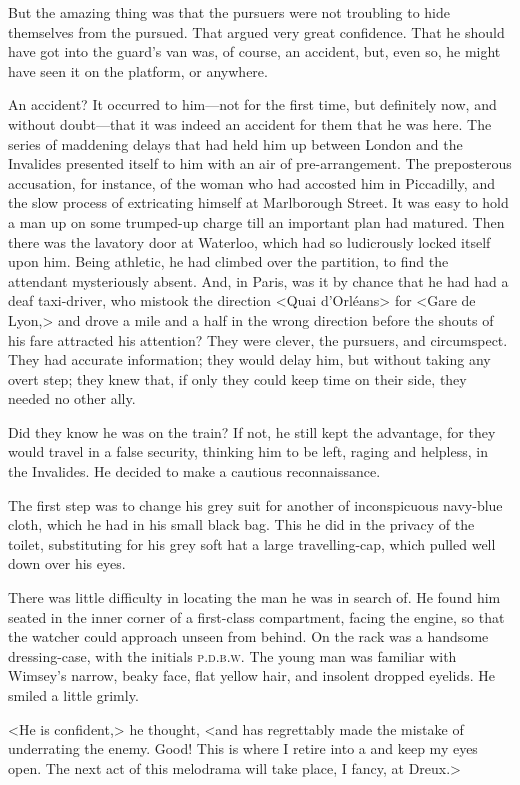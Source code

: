 But the amazing thing was that the pursuers were not troubling to hide themselves from the pursued. That argued very great confidence. That he should have got into the guard's van was, of course, an accident, but, even so, he might have seen it on the platform, or anywhere.

An accident? It occurred to him—not for the first time, but definitely now, and without doubt—that it was indeed an accident for them that he was here. The series of maddening delays that had held him up between London and the Invalides presented itself to him with an air of pre-arrangement. The preposterous accusation, for instance, of the woman who had accosted him in Piccadilly, and the slow process of extricating himself at Marlborough Street. It was easy to hold a man up on some trumped-up charge till an important plan had matured. Then there was the lavatory door at Waterloo, which had so ludicrously locked itself upon him. Being athletic, he had climbed over the partition, to find the attendant mysteriously absent. And, in Paris, was it by chance that he had had a deaf taxi-driver, who mistook the direction <Quai d'Orléans> for <Gare de Lyon,> and drove a mile and a half in the wrong direction before the shouts of his fare attracted his attention? They were clever, the pursuers, and circumspect. They had accurate information; they would delay him, but without taking any overt step; they knew that, if only they could keep time on their side, they needed no other ally.

Did they know he was on the train? If not, he still kept the advantage, for they would travel in a false security, thinking him to be left, raging and helpless, in the Invalides. He decided to make a cautious reconnaissance.

The first step was to change his grey suit for another of inconspicuous navy-blue cloth, which he had in his small black bag. This he did in the privacy of the toilet, substituting for his grey soft hat a large travelling-cap, which pulled well down over his eyes.

There was little difficulty in locating the man he was in search of. He found him seated in the inner corner of a first-class compartment, facing the engine, so that the watcher could approach unseen from behind. On the rack was a handsome dressing-case, with the initials \textsc{p.d.b.w.} The young man was familiar with Wimsey's narrow, beaky face, flat yellow hair, and insolent dropped eyelids. He smiled a little grimly.

<He is confident,> he thought, <and has regrettably made the mistake of underrating the enemy. Good! This is where I retire into a  and keep my eyes open. The next act of this melodrama will take place, I fancy, at Dreux.>

